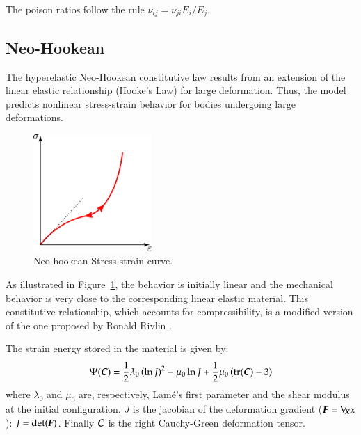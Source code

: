 The poison ratios follow the rule $\nu_{ij} = \nu_{ji} E_i / E_j$.

\subsection{Neo-Hookean}
The hyperelastic Neo-Hookean constitutive law results from an
extension of the linear elastic relationship (Hooke's Law) for large
deformation. Thus, the model predicts nonlinear stress-strain behavior
for bodies undergoing large deformations.

\begin{figure}[!htb]
  \begin{center}
    \includegraphics[width=0.4\textwidth,keepaspectratio=true]{figures/stress_strain_neo.pdf}
    \caption{Neo-hookean Stress-strain curve.}
    \label{fig:smm:cl:neo_hookean}
  \end{center}
\end{figure}

As illustrated in Figure~\ref{fig:smm:cl:neo_hookean}, the behavior is initially
linear and the mechanical behavior is very close to the corresponding linear
elastic material. This constitutive relationship, which accounts for compressibility,
is a modified version of the one proposed by Ronald Rivlin \cite{Belytschko:2000}.

The strain energy stored in the material is given by:
\begin{equation}\label{eqn:smm:constitutive:neohookean_potential}
  \Psi(\boldsymbol{C}) = \frac{1}{2}\lambda_0\left(\ln J\right)^2-\mu_0\ln J+\frac{1}{2}
  \mu_0\left(\mathrm{tr}(\boldsymbol{C})-3\right)
\end{equation}
\noindent where $\lambda_0$ and $\mu_0$ are, respectively, Lam\'e's first parameter
and the shear modulus at the initial configuration. $J$ is the jacobian of the deformation
gradient ($\boldsymbol{F}=\nabla_{\!\!\boldsymbol{X}}\boldsymbol{x}$): $J=\text{det}(\boldsymbol{F})$. Finally $\boldsymbol{C}$ is the right Cauchy-Green
deformation tensor.


